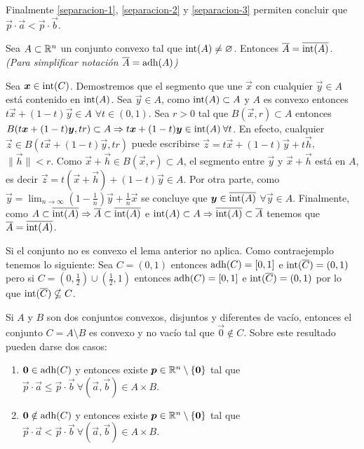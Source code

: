 \begin{demostracion}
Finalmente \eqref{separacion-1}, \eqref{separacion-2} y \eqref{separacion-3} permiten concluir que $\vec{p}\cdot \vec{a} < \vec{p}\cdot \vec{b}$.
\end{demostracion}

\begin{lema}
Sea $A \subset \mathbb{R}^n$ un conjunto convexo tal que $\text{int}({A})\neq \varnothing$. Entonces $\overline{A} = \overline{\text{int}({A})}$. \emph{(Para simplificar notaci\'on $\overline{A} = \text{adh}({A})$)} 
\end{lema}

\begin{demostracion}
Sea $\boldsymbol{x} \in \text{int}({C})$. Demostremos que el segmento que une $\vec{x}$ con cualquier $\vec{y}\in A$ est\'a contenido en $\text{int}({A})$. Sea $\vec{y}\in A$, como $\text{int}({A}) \subset A$ y $A$ es convexo entonces $t\vec{x} + (1-t)\vec{y} \in A$ $\forall t \in (0,1)$. Sea $r> 0$ tal que $B(\vec{x},r) \subset A$ entonces $B(t\boldsymbol{x} + (1-t)\boldsymbol{y} , tr) \subset A \Rightarrow t\boldsymbol{x} + (1-t)\boldsymbol{y} \in \text{int}({A}) \: \forall t$. En efecto, cualquier $\vec{z} \in B(t\vec{x} + (1-t)\vec{y} , tr) $ puede escribirse $\vec{z} = t\vec{x} + (1-t)\vec{y} + t\vec{h}$, $\|\vec{h}\| < r$. Como $\vec{x} + \vec{h} \in B(\vec{x},r) \subset A$, el segmento entre $\vec{y}$ y $\vec{x} + \vec{h}$ est\'a en $A$, es decir $\vec{z} = t(\vec{x}+\vec{h}) + (1-t)\vec{y} \in A$. 
Por otra parte, como $\vec{y} = \lim_{n \to \infty} \left(1-\frac{1}{n}\right) \vec{y} + \frac{1}{n}\vec{x}$ se concluye que $\boldsymbol{y} \in \overline{\text{int}({A})}$ $\forall \vec{y} \in A$. Finalmente, como $A \subset \overline{\text{int}({A})} \Rightarrow \overline{A} \subset \overline{\text{int}({A})}$  e $\text{int}({A}) \subset A \Rightarrow \overline{\text{int}({A})} \subset \overline{A}$ tenemos que $\overline{A} = \overline{\text{int}({A})}$.
\end{demostracion}

Si el conjunto no es convexo el lema anterior no aplica. Como contraejemplo tenemos lo siguiente: Sea $C=(0,1)$ entonces $\text{adh}({C})=[0,1]$ e $\text{int}({\overline{C}})=(0,1)$ pero si $C=(0,\frac{1}{2})\cup (\frac{1}{2},1)$ entonces $\text{adh}({C})=[0,1]$ e $\text{int}({\overline{C}}) = (0,1)$ por lo que $\text{int}({\overline{C}}) \nsubseteq C$.


\begin{corolario}\label{cor-separacion}
Si $A$ y $B$ son dos conjuntos convexos, disjuntos y diferentes de vac\'io, entonces el conjunto $C=A\setminus B$ es convexo y no vac\'io tal que $\vec{0}\notin C$. Sobre este resultado pueden darse dos casos:
\begin{enumerate}
\item $\boldsymbol{0} \in \text{adh}({C})$ y entonces existe $\boldsymbol{p}\in \mathbb{R}^n\setminus \{\boldsymbol{0}\}$ tal que $\vec{p}\cdot \vec{a} \leq \vec{p}\cdot \vec{b} \:\forall (\vec{a},\vec{b})\in A\times B$.
\item $\boldsymbol{0} \notin \text{adh}({C})$ y entonces existe $\boldsymbol{p}\in \mathbb{R}^n\setminus \{\boldsymbol{0}\}$ tal que $\vec{p}\cdot \vec{a} < \vec{p}\cdot \vec{b} 
\:\forall (\vec{a},\vec{b})\in A\times B$.
\end{enumerate} 
\end{corolario}

